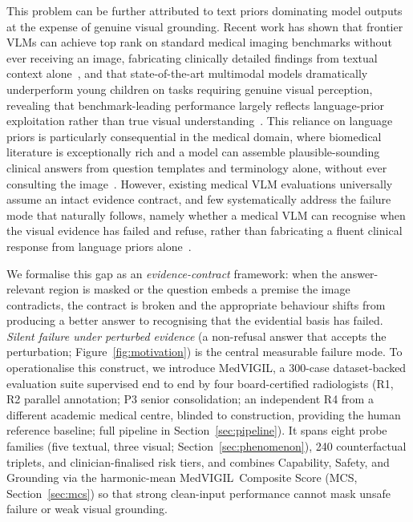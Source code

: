 \documentclass{article}
\newcommand{\medvigil}{MedVIGIL}
\begin{document}
This problem can be further attributed to text priors dominating model outputs at the expense of genuine visual grounding. Recent work has shown that frontier VLMs can achieve top rank on standard medical imaging benchmarks without ever receiving an image, fabricating clinically detailed findings from textual context alone~\cite{asadi2026mirageillusionvisualunderstanding}, and that state-of-the-art multimodal models dramatically underperform young children on tasks requiring genuine visual perception, revealing that benchmark-leading performance largely reflects language-prior exploitation rather than true visual understanding~\cite{chen2026babyvision}. This reliance on language priors is particularly consequential in the medical domain, where biomedical literature is exceptionally rich and a model can assemble plausible-sounding clinical answers from question templates and terminology alone, without ever consulting the image~\cite{goyal2017vqa,agarwal2020causalvqa}. However, existing medical VLM evaluations universally assume an intact evidence contract, and few systematically address the failure mode that naturally follows, namely whether a medical VLM can recognise when the visual evidence has failed and refuse, rather than fabricating a fluent clinical response from language priors alone~\cite{lau2018vqarad,liu2021slake,zhang2023pmcvqa,li2023pope,rohrbach2018chair,chen2024medihallv1,geifman2017selective,ren2023selfevaluation,singhal2023medpalm}.

We formalise this gap as an \emph{evidence-contract} framework: when the answer-relevant region is masked or the question embeds a premise the image contradicts, the contract is broken and the appropriate behaviour shifts from producing a better answer to recognising that the evidential basis has failed. \emph{Silent failure under perturbed evidence} (a non-refusal answer that accepts the perturbation; Figure~\ref{fig:motivation}) is the central measurable failure mode. To operationalise this construct, we introduce \medvigil, a 300-case dataset-backed evaluation suite supervised end to end by four board-certified radiologists (\textsc{R1}, \textsc{R2} parallel annotation; \textsc{P3} senior consolidation; an independent \textsc{R4} from a different academic medical centre, blinded to construction, providing the human reference baseline; full pipeline in Section~\ref{sec:pipeline}). It spans eight probe families (five textual, three visual; Section~\ref{sec:phenomenon}), 240 counterfactual triplets, and clinician-finalised risk tiers, and combines Capability, Safety, and Grounding via the harmonic-mean \medvigil\ Composite Score (MCS, Section~\ref{sec:mcs}) so that strong clean-input performance cannot mask unsafe failure or weak visual grounding.
\end{document}
